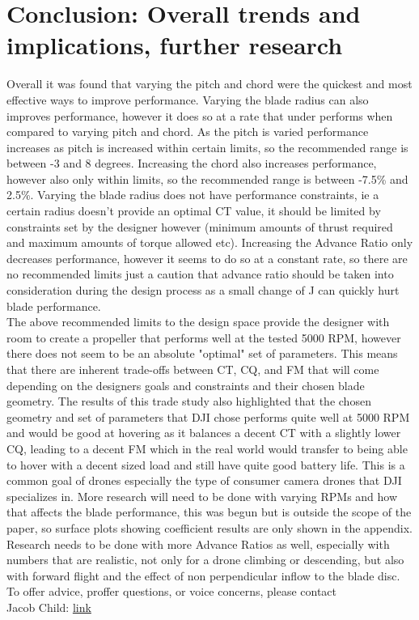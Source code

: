 \documentclass[12pt]{texmemo} %
\begin{document}
\vspace{5mm} %

\section{Conclusion: Overall trends and implications, further research}
Overall it was found that varying the pitch and chord were the quickest and most effective ways to improve performance. Varying the blade radius can also improves performance, however it does so at a rate that under performs when compared to varying pitch and chord. As the pitch is varied performance increases as pitch is increased within certain limits, so the recommended range is between -3 and 8 degrees. Increasing the chord also increases performance, however also only within limits, so the recommended range is between -7.5\% and 2.5\%. Varying the blade radius does not have performance constraints, ie a certain radius doesn't provide an optimal CT value, it should be limited by constraints set by the designer however (minimum amounts of thrust required and maximum amounts of torque allowed etc). Increasing the Advance Ratio only decreases performance, however it seems to do so at a constant rate, so there are no recommended limits just a caution that advance ratio should be taken into consideration during the design process as a small change of J can quickly hurt blade performance.\\
The above recommended limits to the design space provide the designer with room to create a propeller that performs well at the tested 5000 RPM, however there does not seem to be an absolute "optimal" set of parameters. This means that there are inherent trade-offs between CT, CQ, and FM that will come depending on the designers goals and constraints and their chosen blade geometry.
The results of this trade study also highlighted that the chosen geometry and set of parameters that DJI chose performs quite well at 5000 RPM and would be good at hovering as it balances a decent CT with a slightly lower CQ, leading to a decent FM which in the real world would transfer to being able to hover with a decent sized load and still have quite good battery life. This is a common goal of drones especially the type of consumer camera drones that DJI specializes in.
More research will need to be done with varying RPMs and how that affects the blade performance, this was begun but is outside the scope of the paper, so surface plots showing coefficient results are only shown in the appendix. Research needs to be done with more Advance Ratios as well, especially with numbers that are realistic, not only for a drone climbing or descending, but also with forward flight and the effect of non perpendicular inflow to the blade disc.
\\
To offer advice, proffer questions, or voice concerns, please contact\\ Jacob Child: \href{mailto: childjacob2@gmail.com}{link}
\end{document}

